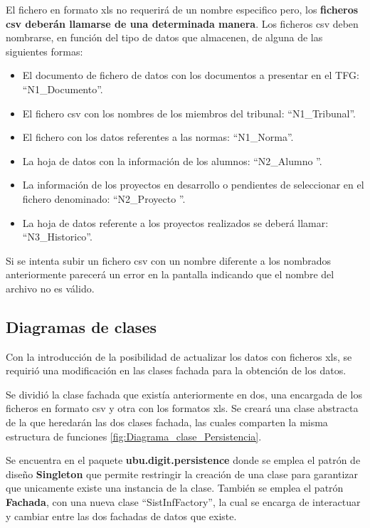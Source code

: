 El fichero en formato xls no requerirá de un nombre especifico pero, los \textbf{ficheros csv deberán llamarse de una determinada manera}. Los ficheros csv deben nombrarse, en función del tipo de datos que almacenen, de alguna de las siguientes formas:
\begin{itemize}
	\tightlist
	\item El documento de fichero de datos con los documentos a presentar en el TFG: ``N1\_Documento''.
	\item El fichero csv con los nombres de los miembros del tribunal: ``N1\_Tribunal''.
	\item El fichero con los datos referentes a las normas: ``N1\_Norma''.
	\item La hoja de datos con la información de los alumnos: ``N2\_Alumno ''.
	\item La información de los proyectos en desarrollo o pendientes de seleccionar en el fichero denominado: ``N2\_Proyecto ''.
	\item La hoja de datos referente a los proyectos realizados se deberá llamar: ``N3\_Historico''.
\end{itemize}

Si se intenta subir un fichero csv con un nombre diferente a los nombrados anteriormente parecerá un error en la pantalla indicando que el nombre del archivo no es válido.

\subsection{Diagramas de clases}	
Con la introducción de la posibilidad de actualizar los datos con ficheros xls, se requirió una modificación en las clases fachada para la obtención de los datos. 

Se dividió la clase fachada que existía anteriormente en dos, una encargada de los ficheros en formato csv y otra con los formatos xls. Se creará una clase abstracta de la que heredarán las dos clases fachada, las cuales comparten la misma estructura de funciones \ref{fig:Diagrama_clase_Persistencia}.

Se encuentra en el paquete \textbf{ubu.digit.persistence} donde se emplea el patrón de diseño \textbf{Singleton} que permite restringir la creación de una clase para garantizar que unicamente existe una instancia de la clase. También se emplea el patrón \textbf{Fachada}, con una nueva clase ``SistInfFactory'', la cual se encarga de interactuar y cambiar entre las dos fachadas de datos que existe.

